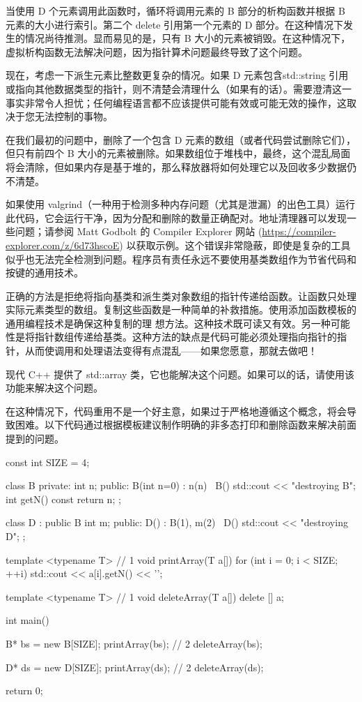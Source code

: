 当使用 D 个元素调用此函数时，循环将调用元素的 B 部分的析构函数并根据 B 元素的大小进行索引。第二个 delete 引用第一个元素的 D 部分。在这种情况下发生的情况尚待推测。显而易见的是，只有 B 大小的元素被销毁。在这种情况下，虚拟析构函数无法解决问题，因为指针算术问题最终导致了这个问题。

现在，考虑一下派生元素比整数更复杂的情况。如果 D 元素包含std::string 引用或指向其他数据类型的指针，则不清楚会清理什么（如果有的话）。需要澄清这一事实非常令人担忧；任何编程语言都不应该提供可能有效或可能无效的操作，这取决于您无法控制的事物。

在我们最初的问题中，删除了一个包含 D 元素的数组（或者代码尝试删除它们），但只有前四个 B 大小的元素被删除。如果数组位于堆栈中，最终，这个混乱局面将会清除，但如果内存是基于堆的，那么释放器将如何处理它以及回收多少数据仍不清楚。

如果使用 valgrind（一种用于检测多种内存问题（尤其是泄漏）的出色工具）运行此代码，它会运行干净，因为分配和删除的数量正确配对。地址清理器可以发现一些问题；请参阅 Matt Godbolt 的 Compiler Explorer 网站 (\url{https://compiler-explorer.com/z/6d73hscoE}) 以获取示例。这个错误非常隐蔽，即使是复杂的工具似乎也无法完全检测到问题。程序员有责任永远不要使用基类数组作为节省代码和按键的通用技术。


正确的方法是拒绝将指向基类和派生类对象数组的指针传递给函数。让函数只处理实际元素类型的数组。复制这些函数是一种简单的补救措施。使用添加函数模板的通用编程技术是确保这种复制的理 想方法。这种技术既可读又有效。另一种可能性是将指针数组传递给基类。这种方法的缺点是代码可能必须处理指向指针的指针，从而使调用和处理语法变得有点混乱——如果您愿意，那就去做吧！

现代 C++ 提供了 std::array 类，它也能解决这个问题。如果可以的话，请使用该功能来解决这个问题。

在这种情况下，代码重用不是一个好主意，如果过于严格地遵循这个概念，将会导致困难。以下代码通过根据模板建议制作明确的非多态打印和删除函数来解决前面提到的问题。


\begin{cpp}
const int SIZE = 4;

class B {
private:
  int n;
public:
  B(int n=0) : n(n) {}
  ~B() { std::cout << "destroying B\n"; }
  int getN() const { return n; }
};

class D : public B {
  int m;
public:
  D() : B(1), m(2) {}
  ~D() { std::cout << "destroying D\n"; }
};

template <typename T> // 1
void printArray(T a[]) {
  for (int i = 0; i < SIZE; ++i)
    std::cout << a[i].getN() << '\n';
}

template <typename T> // 1
void deleteArray(T a[]) {
  delete [] a;
}

int main() {
  B* bs = new B[SIZE];
  printArray(bs); // 2
  deleteArray(bs);

  D* ds = new D[SIZE];
  printArray(ds); // 2
  deleteArray(ds);

  return 0;
}
\end{cpp}

